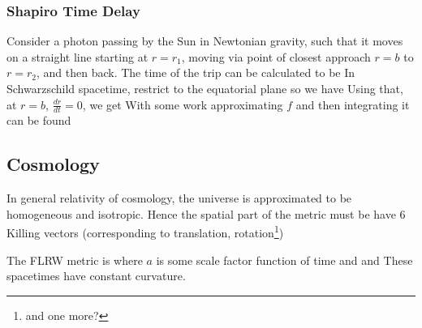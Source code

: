 \documentclass{article}
\begin{document}
\subsubsection{Shapiro Time Delay}
Consider a photon passing by the Sun in Newtonian gravity, such that it moves on a straight line starting at $r=r_1$, moving via point of closest approach $r=b$ to $r=r_2$, and then back. The time of the trip can be calculated to be 
In Schwarzschild spacetime, restrict to the equatorial plane so we have 
Using that, at $r=b$, $\frac{dr}{dt} = 0$, we get 
With some work approximating $f$ and then integrating it can be found 
\subsection{Cosmology}
In general relativity of cosmology, the universe is approximated to be homogeneous and isotropic. Hence the spatial part of the metric must be have 6 Killing vectors (corresponding to translation, rotation\footnote{and one more?})
\begin{definition}
The FLRW metric is 
where $a$ is some scale factor function of time and 
and 
These spacetimes have constant curvature.
\end{definition}
\end{document}
